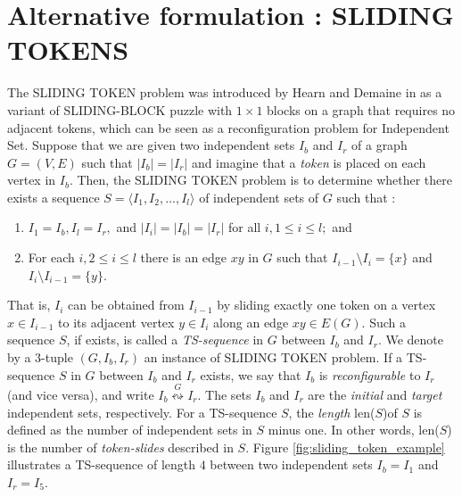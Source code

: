 \section{Alternative formulation : SLIDING TOKENS} \label{sec:sliding_tokens}
The SLIDING TOKEN problem was introduced by Hearn and Demaine in \cite{hearn_pspace-completeness_2004} as a variant of SLIDING-BLOCK puzzle
with $1 \times 1 $ blocks on a graph that requires no adjacent tokens, which can be seen as a reconfiguration problem for Independent Set.
Suppose that we are given two independent sets $I_b$ and $I_r$ of a graph $G =(V,E)$ such that $|I_b| = |I_r|$ and imagine that a
\textit{token} is placed on each vertex in $I_b$. Then, the SLIDING TOKEN problem is to determine whether there exists a sequence
$ S = \langle I_1, I_2, \dots, I_l \rangle$ of independent sets of $G$ such that :
\begin{enumerate}
  \item $I_1 = I_b, I_l = I_r,$ and $|I_i| = |I_b| = |I_r|$ for all $i, 1 \leq i \leq l;$ and
  \item For each $i, 2 \leq i \leq l$ there is an edge $xy$ in $G$ such that  $I_{i-1} \setminus I_{i} = \{x\}$ and $I_{i} \setminus I_{i-1} = \{y\}$.
\end{enumerate}
That is, $I_i$ can be obtained from $I_{i-1}$ by sliding exactly one token on a vertex $x \in I_{i-1}$ to its adjacent vertex $y \in I_{i}$
along an edge $xy \in E(G)$. Such a sequence $S$, if exists, is called a \textit{TS-sequence} in $G$ between $I_b$ and $I_r$.
We denote by a $3$-tuple $(G, I_{b}, I_{r})$ an instance of SLIDING TOKEN problem.  If a TS-sequence $S$ in $G$ between $I_{b}$ and $I_{r}$ exists,
we say that $I_{b}$ is \textit{reconfigurable} to $I_{r}$ (and vice versa), and write $I_{b} \overset{G}\leftrightsquigarrow I_{r}$. The sets
$I_{b}$ and $I_{r}$ are the \textit{initial} and \textit{target} independent sets, respectively. For a TS-sequence $S$, the \textit{length}
len($S$)of $S$ is defined as the number of independent sets in $S$ minus one. In other words, len($S$) is the number of \textit{token-slides}
described in $S$. Figure \ref{fig:sliding_token_example} illustrates a TS-sequence of length $4$ between two independent sets
$I_{b} = I_{1}$ and $I_{r} = I_{5}$.

